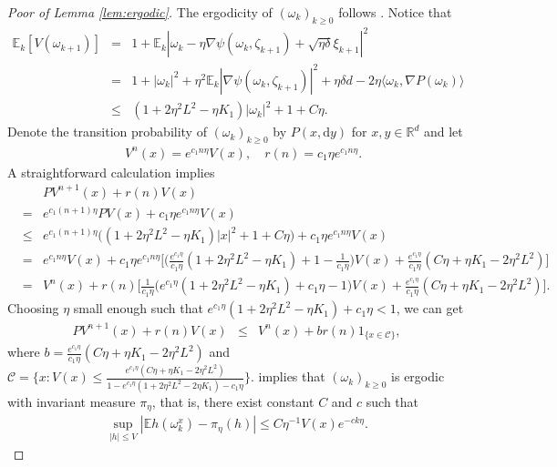 \documentclass[12pt]{amsart}
\theoremstyle{definition}
\theoremstyle{remark}
\numberwithin{equation}{section}
\newcommand{\dif}{\mathrm{d}}
\newcommand{\E}{\mathbb{E}}            %
\newcommand{\Ll}{\langle}
\newcommand{\Rr}{\rangle}
\newcommand{\R}{\mathbb{R}}\newcommand{\RR}{\mathbb{R}}
\begin{document}
\begin{appendix}
\begin{proof}[Poor of Lemma  \ref{lem:ergodic}]
	The ergodicity of $(\omega_k)_{k\ge0}$ follows  \cite[Theorem 2.1]{Tweedie94}. Notice that
	\begin{eqnarray*}
		\E_k[V(\omega_{k+1})]&=& 1+ \E_{k}|\omega_k-\eta\nabla\psi(\omega_k,\zeta_{k+1})+\sqrt{\eta\delta}\xi_{k+1}|^2\\
		&=& 1+ |\omega_k|^2+\eta^2\E_{k}|\nabla\psi(\omega_k,\zeta_{k+1})|^2+\eta\delta d- 2\eta\Ll \omega_k, \nabla P(\omega_k)\Rr\\
		&\le& (1+2\eta^2L^2-\eta K_1)|\omega_k|^2+1+C\eta.
	\end{eqnarray*}
	Denote the transition probability of $(\omega_k)_{k\ge0}$ by $P(x,\dif y)$ for $x,y\in\R^d$ and let
	\begin{align*}
		\quad V^n (x)=e^{c_1 n\eta}V(x),\quad r(n)= c_1\eta e^{c_1 n\eta}.
	\end{align*}
	A straightforward calculation implies 
	\begin{eqnarray*}
		&&PV^{n+1}(x)+r(n)V(x)\\
		&=&e^{c_1(n+1)\eta}P V(x)+c_1\eta e^{c_1n\eta}V(x)\\
		&\le& e^{c_1(n+1)\eta}\big((1+2\eta^2L^2-\eta K_1)|x|^2+1+C\eta\big)+c_1\eta e^{c_1n\eta}V(x)\\
		&=& e^{c_1n\eta}V(x)+c_1\eta e^{c_1n\eta}\big[\big(\frac {e^{c_1\eta}}{c_1\eta}(1+2\eta^2L^2-\eta K_1)+1-\frac{1}{c_1\eta}\big)V(x)+\frac {e^{c_1\eta}}{c_1\eta}(C\eta+\eta K_1-2\eta^2L^2)\big]\\
		&=& V^n(x)+r(n)\big[\frac {1}{c_1\eta}\big(e^{c_1\eta}(1+2\eta^2L^2-\eta K_1)+c_1\eta-1\big)V(x)+\frac {e^{c_1\eta}}{c_1\eta}(C\eta+\eta K_1-2\eta^2L^2)\big].
	\end{eqnarray*}
	Choosing $\eta$ small enough such that $e^{c_1\eta}(1+2\eta^2L^2-\eta K_1)+c_1\eta<1$, we can get
	\begin{eqnarray*}
		P V^{n+1}(x)+r(n)V(x)
		&\le& V^n(x)+br(n)1_{\{x\in \mathcal{C}\}},
	\end{eqnarray*}
	where $b=\frac {e^{c_1\eta}}{c_1\eta}(C\eta+\eta K_1-2\eta^2L^2)$ and $\mathcal{C}=\{x:V(x)\le \frac{  e^{c_1\eta}(C\eta+\eta K_1-2\eta^2 L^2)}{1-e^{c_1\eta}(1+2\eta^2L^2-2\eta K_1)-c_1\eta}\}$.  \cite[Theorem 2.1]{Tweedie94} implies that $(\omega_k)_{k\ge0}$ is ergodic with invariant measure $\pi_\eta$, that is, there exist constant $C$ and $c$ such that
	\begin{eqnarray}\label{e:ergod2}
		\sup_{|h|\le V}|\E h(\omega_k^x)-\pi_\eta(h)|\le C\eta^{-1}V(x)e^{-ck\eta}.
	\end{eqnarray} 	
\end{proof}
\end{appendix}
\end{document}
